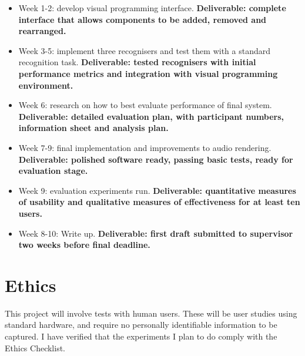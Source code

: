 \documentclass[11pt]{article}
\begin{document}
\begin{itemize}
    \tightlist
    \item
      Week 1-2: develop visual programming interface. \textbf{Deliverable:
      complete interface that allows components to be added, removed and
      rearranged.}
    \item
      Week 3-5: implement three recognisers and test them with a standard
      recognition task. \textbf{Deliverable: tested recognisers with
      initial performance metrics and integration with visual programming
      environment.}
    \item
      Week 6: research on how to best evaluate performance of final system.
      \textbf{Deliverable: detailed evaluation plan, with participant
      numbers, information sheet and analysis plan.}
    \item
      Week 7-9: final implementation and improvements to audio rendering.
      \textbf{Deliverable: polished software ready, passing basic tests,
      ready for evaluation stage.}
    \item
      Week 9: evaluation experiments run. \textbf{Deliverable: quantitative
      measures of usability and qualitative measures of effectiveness for at
      least ten users.}
    \item
      Week 8-10: Write up. \textbf{Deliverable: first draft submitted to
      supervisor two weeks before final deadline.}
    \end{itemize}
    

\section{Ethics}

This project will involve tests with human users.  These will be user studies
using standard hardware, and require no personally identifiable information to be captured.
I have verified that the experiments I plan to do comply with the Ethics Checklist.
\end{document}
